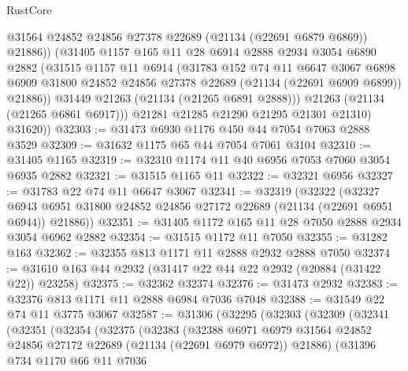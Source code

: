 \begin{lexlean}{RustCore}
\begin{coremodule}
                @31564
                @24852
                @24856
                @27378
                @22689
                (@21134 (@22691 @6879 @6869))
                @21886))
            (@31405
              @1157
              @165
              @11
              @28
              @6914
              @2888
              @2934
              @3054
              @6890
              @2882
              (@31515
                @1157
                @11
                @6914
                (@31783
                  @152
                  @74
                  @11
                  @6647
                  @3067
                  @6898
                  @6909
                  @31800
                  @24852
                  @24856
                  @27378
                  @22689
                  (@21134 (@22691 @6909 @6899))
                  @21886))
              @31449
              @21263
              (@21134 (@21265 @6891 @2888)))
            @21263
            (@21134 (@21265 @6861 @6917)))
          @21281
          @21285
          @21290
          @21295
          @21301
          @21310)
        @31620))
@32303 := @31473 @6930 @1176 @450 @44 @7054 @7063 @2888 @3529
@32309 := @31632 @1175 @65 @44 @7054 @7061 @3104
@32310 := @31405 @1165
@32319 := @32310 @1174 @11 @40 @6956 @7053 @7060 @3054 @6935 @2882
@32321 := @31515 @1165 @11
@32322 := @32321 @6956
@32327 := @31783 @22 @74 @11 @6647 @3067
@32341 := @32319
    (@32322
      (@32327 @6943 @6951 @31800 @24852 @24856 @27172 @22689 (@21134 (@22691 @6951 @6944)) @21886))
@32351 := @31405 @1172 @165 @11 @28 @7050 @2888 @2934 @3054 @6962 @2882
@32354 := @31515 @1172 @11 @7050
@32355 := @31282 @163
@32362 := @32355 @813 @1171 @11 @2888 @2932 @2888 @7050
@32374 := @31610 @163 @44 @2932 (@31417 @22 @44 @22 @2932 (@20884 (@31422 @22)) @23258)
@32375 := @32362 @32374
@32376 := @31473 @2932
@32383 := @32376 @813 @1171 @11 @2888 @6984 @7036 @7048
@32388 := @31549 @22 @74 @11 @3775 @3067
@32587 := @31306
    (@32295
      (@32303
        (@32309
          (@32341
            (@32351
              (@32354
                (@32375
                  (@32383
                    (@32388
                      @6971
                      @6979
                      @31564
                      @24852
                      @24856
                      @27172
                      @22689
                      (@21134 (@22691 @6979 @6972))
                      @21886)
                    (@31396
                      @734
                      @1170
                      @66
                      @11
                      @7036

\end{coremodule}
\end{lexlean}
